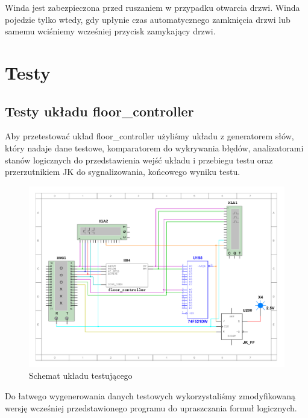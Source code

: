 \documentclass[a4paper]{article}
\begin{document}
Winda jest zabezpieczona przed ruszaniem w przypadku otwarcia drzwi. Winda pojedzie tylko wtedy, gdy upłynie
czas automatycznego zamknięcia drzwi lub samemu wciśniemy wcześniej przycisk zamykający drzwi.

\section{Testy}
\subsection{Testy układu floor\_controller}
Aby przetestować układ floor\_controller użyliśmy układu z generatorem słów, który
nadaje dane testowe, komparatorem do wykrywania błędów, analizatorami stanów
logicznych do przedstawienia wejść układu i przebiegu testu oraz przerzutnikiem JK
do sygnalizowania, końcowego wyniku testu.

\begin{figure}[H]
    \centering
    \includegraphics[width=\textwidth]{component_test_floor_controller.pdf}
    \caption{Schemat układu testującego}
\end{figure}

Do łatwego wygenerowania danych testowych wykorzystaliśmy zmodyfikowaną wersję wcześniej przedstawionego
programu do upraszczania formuł logicznych.
\end{document}

